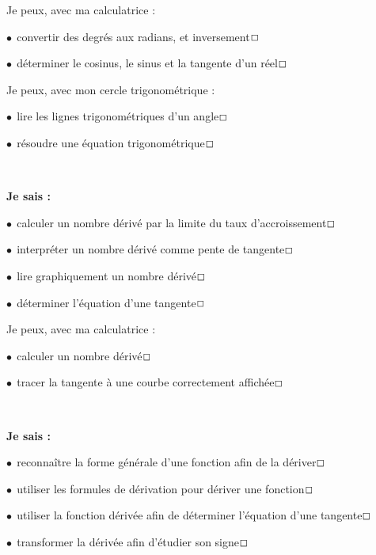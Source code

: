 \documentclass[a4paper,11pt]{article}
\begin{document}
\begin{ccalco}
\selectfont\small
Je peux, avec ma calculatrice :

\tabula{}$\bullet~~$convertir des degrés aux radians, et inversement\dotfill{}$\Large\Box$

\tabula{}$\bullet~~$déterminer le cosinus, le sinus et la tangente d'un réel\dotfill{}$\Large\Box$
\end{ccalco}

\begin{coutil}
\selectfont\small
Je peux, avec mon cercle trigonométrique :

\tabula{}$\bullet~~$lire les lignes trigonométriques d'un angle\dotfill{}$\Large\Box$

\tabula{}$\bullet~~$résoudre une équation trigonométrique\dotfill{}$\Large\Box$
\end{coutil}

\color{titrebleu}\,\hrulefill\,

\begin{casavoir}
\selectfont\small
\textbf{Je sais :}

\tabula{}$\bullet~~$calculer un nombre dérivé par la limite du taux d'accroissement\dotfill{}$\Large\Box$

\tabula{}$\bullet~~$interpréter un nombre dérivé comme pente de tangente\dotfill{}$\Large\Box$

\tabula{}$\bullet~~$lire graphiquement un nombre dérivé\dotfill{}$\Large\Box$

\tabula{}$\bullet~~$déterminer l'équation d'une tangente\dotfill{}$\Large\Box$
\end{casavoir}

\begin{ccalco}
\selectfont\small
Je peux, avec ma calculatrice :

\tabula{}$\bullet~~$calculer un nombre dérivé\dotfill{}$\Large\Box$

\tabula{}$\bullet~~$tracer la tangente à une courbe correctement affichée\dotfill{}$\Large\Box$
\end{ccalco}

\color{titrebleu}\,\hrulefill\,

\begin{casavoir}
\selectfont\small
\textbf{Je sais :}

\tabula{}$\bullet~~$reconnaître la forme générale d'une fonction afin de la dériver\dotfill{}$\Large\Box$

\tabula{}$\bullet~~$utiliser les formules de dérivation pour dériver une fonction\dotfill{}$\Large\Box$

\tabula{}$\bullet~~$utiliser la fonction dérivée afin de déterminer l'équation d'une tangente\dotfill{}$\Large\Box$

\tabula{}$\bullet~~$transformer la dérivée afin d'étudier son signe\dotfill{}$\Large\Box$
\end{casavoir}
\end{document}
